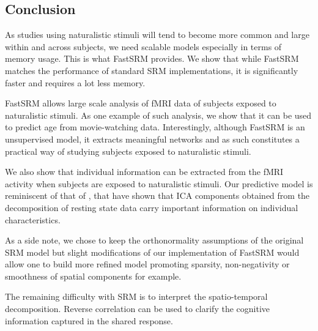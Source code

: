 \subsection{Conclusion}
As studies using naturalistic stimuli will tend to become more common and large within and across subjects, we need scalable models especially in terms of memory usage.
%
This is what FastSRM provides.
%
We show that while FastSRM matches the performance of standard SRM implementations, it is
significantly faster and requires a lot less memory.

FastSRM allows large scale analysis of fMRI data of subjects exposed to naturalistic stimuli. As one example of such analysis, we show that it can be used to predict age from movie-watching data. Interestingly, although FastSRM is an unsupervised model, it extracts meaningful networks and as such constitutes a practical way of studying subjects exposed to naturalistic stimuli.

We also show that individual information can be extracted from the fMRI activity when subjects are exposed to naturalistic stimuli. Our predictive model is reminiscent of that of \cite{bijsterbosch2018relationship}, that have shown that ICA components obtained from the decomposition of resting state data carry important information on individual characteristics. 
%

As a side note, we chose to keep the orthonormality assumptions of the original SRM model but slight modifications of our implementation of FastSRM would allow one to build more refined model promoting sparsity, non-negativity or smoothness of spatial components for example.

The remaining difficulty with SRM is to interpret the spatio-temporal decomposition. Reverse correlation \cite{hasson2004intersubject} can be used to clarify the cognitive information captured in the shared response.